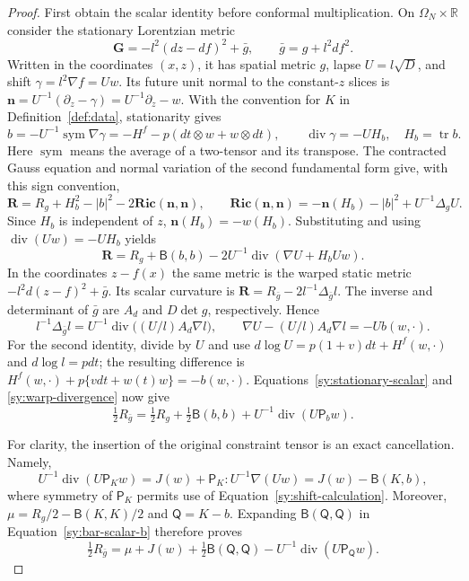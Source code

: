 \begin{proof}
First obtain the scalar identity before conformal multiplication.
On $\Omega_N\times\mathbb R$ consider the stationary Lorentzian metric
\[
 \mathbf G=-l^2(dz-df)^2+\bar g,
 \qquad \bar g=g+l^2df^2.
\]
Written in the coordinates $(x,z)$, it has spatial metric $g$, lapse
$U=l\sqrt D$, and shift $\gamma=l^2\nabla f=Uw$.
Its future unit normal to the constant-$z$ slices is
$\mathbf n=U^{-1}(\partial_z-\gamma)=U^{-1}\partial_z-w$.
With the convention for $K$ in Definition~\ref{def:data}, stationarity
gives
\begin{equation}\label{sy:shift-calculation}
 b=-U^{-1}\operatorname{sym}\nabla\gamma
   =-H^f-p(dt\otimes w+w\otimes dt),\qquad
 \operatorname{div}\gamma=-U H_b,
 \quad H_b=\operatorname{tr}b.
\end{equation}
Here $\operatorname{sym}$ means the average of a two-tensor and its
transpose.  The contracted Gauss equation and normal variation of the
second fundamental form give, with this sign convention,
\[
 \mathbf R=R_g+H_b^2-|b|^2-2\mathbf{Ric}(\mathbf n,\mathbf n),
 \qquad
 \mathbf{Ric}(\mathbf n,\mathbf n)
 =-\mathbf n(H_b)-|b|^2+U^{-1}\Delta_g U.
\]
Since $H_b$ is independent of $z$, $\mathbf n(H_b)=-w(H_b)$.
Substituting and using $\operatorname{div}(Uw)=-UH_b$ yields
\begin{equation}\label{sy:stationary-scalar}
 \mathbf R
 =R_g+\mathsf B(b,b)
       -2U^{-1}\operatorname{div}(\nabla U+H_bUw).
\end{equation}
In the coordinates $z-f(x)$ the same metric is the warped static
metric $-l^2d(z-f)^2+\bar g$.  Its scalar curvature is
$\mathbf R=R_{\bar g}-2l^{-1}\Delta_{\bar g}l$.
The inverse and determinant of $\bar g$ are $A_d$ and $D\det g$,
respectively.  Hence
\begin{equation}\label{sy:warp-divergence}
 l^{-1}\Delta_{\bar g}l
 =U^{-1}\operatorname{div}\bigl((U/l)A_d\nabla l\bigr),
 \qquad
 \nabla U-(U/l)A_d\nabla l=-Ub(w,\cdot).
\end{equation}
For the second identity, divide by $U$ and use
$d\log U=p(1+v)dt+H^f(w,\cdot)$ and $d\log l=pdt$;
the resulting difference is
$H^f(w,\cdot)+p\{vdt+w(t)w\}=-b(w,\cdot)$.
Equations~\ref{sy:stationary-scalar} and
\ref{sy:warp-divergence} now give
\begin{equation}\label{sy:bar-scalar-b}
 \tfrac12R_{\bar g}
 =\tfrac12R_g+\tfrac12\mathsf B(b,b)
       +U^{-1}\operatorname{div}(U\mathsf P_b w).
\end{equation}

For clarity, the insertion of the original constraint tensor is an
exact cancellation.  Namely,
\[
 U^{-1}\operatorname{div}(U\mathsf P_Kw)
 =J(w)+\mathsf P_K:U^{-1}\nabla(Uw)
 =J(w)-\mathsf B(K,b),
\]
where symmetry of $\mathsf P_K$ permits use of
Equation~\ref{sy:shift-calculation}.  Moreover,
$\mu=R_g/2-\mathsf B(K,K)/2$ and
$\mathsf Q=K-b$.  Expanding $\mathsf B(\mathsf Q,\mathsf Q)$
in Equation~\ref{sy:bar-scalar-b} therefore proves
\begin{equation}\label{sy:bar-scalar-Q}
 \tfrac12R_{\bar g}
 =\mu+J(w)+\tfrac12\mathsf B(\mathsf Q,\mathsf Q)
        -U^{-1}\operatorname{div}(U\mathsf P_{\mathsf Q}w).
\end{equation}


\end{proof}
